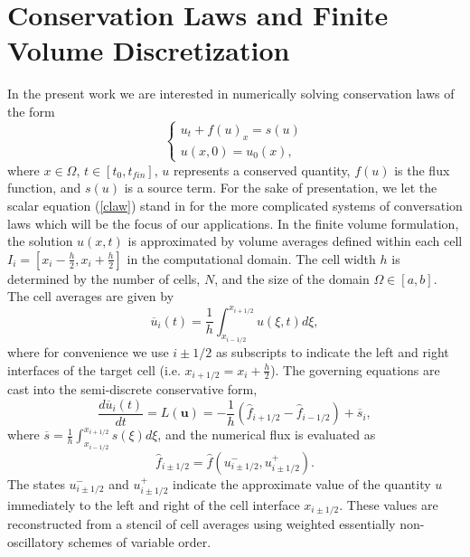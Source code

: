 \documentclass[]{article}
\begin{document}
\section{Conservation Laws and Finite Volume Discretization}

    In the present work we are interested in numerically solving conservation
    laws of the form
    \begin{equation}
    \begin{cases}
      u_{t} + f(u)_{x} = s(u) \\    
      u(x,0) = u_{0}(x),
    \end{cases}
    \label{claw}
    \end{equation}
    where $x \in \Omega$, $t \in [t_{0},t_{fin}]$, $u$ represents a conserved
    quantity, $f(u)$ is the flux function, and $s(u)$ is a source term. For the
    sake of presentation, we let the scalar equation (\ref{claw}) stand in for
    the more complicated systems of conversation laws which will be the focus of
    our applications.  In the finite volume formulation, the solution $u(x,t)$
    is approximated by volume averages defined within each cell $I_{i} = \left[
    x_{i}-\frac{h}{2}, x_{i}+\frac{h}{2} \right]$ in the computational
    domain.  The cell width $h$ is determined by the number of cells, $N$, and
    the size of the domain $\Omega \in \left[a,b\right]$.  The cell averages are
    given by
    \begin{equation}
        \overline{u}_{i}(t) = \frac{1}{h} \int_{x_{i-1/2}}^{x_{i+1/2}} u(\xi,t) d \xi,
    \end{equation}
    where for convenience we use $i \pm 1/2$ as subscripts to indicate the left
    and right interfaces of the target cell (i.e.  $x_{i+1/2} = x_{i} +
    \frac{h}{2}$). The governing equations are cast into the semi-discrete
    conservative form,
    \begin{equation}
        \frac{d \overline{u}_{i}(t)}{dt} = L(\bm{u}) = -\frac{1}{h} \left( \hat{f}_{i+1/2} -
        \hat{f}_{i-1/2} \right) + \overline{s}_{i},
        \label{ode}
    \end{equation}
    where $\overline{s} = \frac{1}{h} \int_{x_{i-1/2}}^{x_{i+1/2}} s(\xi) d
    \xi$, and the numerical flux is evaluated as
    \begin{equation}
        \hat{f}_{i\pm1/2} = \hat{f}(u^{-}_{i\pm1/2}, u^{+}_{i\pm1/2}).
    \end{equation}
    The states $u^{-}_{i\pm1/2}$ and $u^{+}_{i\pm1/2}$ indicate the approximate
    value of the quantity $u$ immediately to the left and right of the cell
    interface $x_{i\pm1/2}$. These values are reconstructed from a stencil of
    cell averages using weighted essentially non-oscillatory schemes of
    variable order.
\end{document}
